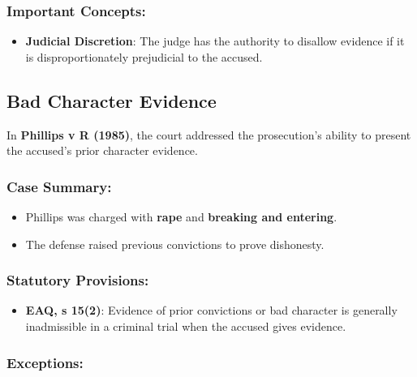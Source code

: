 \subsubsection{Important Concepts:}\label{important-concepts}

\begin{itemize}
\tightlist
\item
  \textbf{Judicial Discretion}: The judge has the authority to disallow
  evidence if it is disproportionately prejudicial to the accused.
\end{itemize}

\subsection{Bad Character Evidence}\label{bad-character-evidence}

In \textbf{Phillips v R (1985)}, the court addressed the prosecution's
ability to present the accused's prior character evidence.

\subsubsection{Case Summary:}\label{case-summary}

\begin{itemize}
\tightlist
\item
  Phillips was charged with \textbf{rape} and \textbf{breaking and
  entering}.
\item
  The defense raised previous convictions to prove dishonesty.
\end{itemize}

\subsubsection{Statutory Provisions:}\label{statutory-provisions-1}

\begin{itemize}
\tightlist
\item
  \textbf{EAQ, s 15(2)}: Evidence of prior convictions or bad character
  is generally inadmissible in a criminal trial when the accused gives
  evidence.
\end{itemize}

\subsubsection{Exceptions:}\label{exceptions-1}

